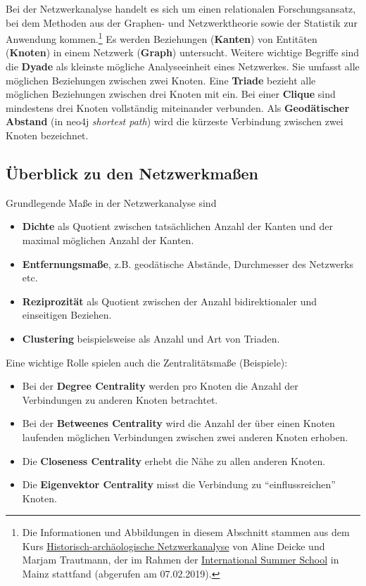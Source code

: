 \documentclass[ngerman,]{scrreprt}
\providecommand{\tightlist}{%
  \setlength{\itemsep}{0pt}\setlength{\parskip}{0pt}}
\begin{document}
Bei der Netzwerkanalyse handelt es sich um einen relationalen Forschungsansatz, bei dem Methoden aus der Graphen- und Netzwerktheorie sowie der Statistik zur Anwendung kommen.\footnote{Die Informationen und Abbildungen in diesem Abschnitt stammen aus dem Kurs \href{https://digitale-methodik.adwmainz.net/mod5/5c/slides/networkAnalysis/2018/\#/step-1}{Historisch-archäologische Netzwerkanalyse} von Aline Deicke und Marjam Trautmann, der im Rahmen der \href{https://iss.adwmainz.net}{International Summer School} in Mainz stattfand (abgerufen am 07.02.2019).} Es werden Beziehungen (\textbf{Kanten}) von Entitäten (\textbf{Knoten}) in einem Netzwerk (\textbf{Graph}) untersucht. Weitere wichtige Begriffe sind die \textbf{Dyade} als kleinste mögliche Analyseeinheit eines Netzwerkes. Sie umfasst alle möglichen Beziehungen zwischen zwei Knoten. Eine \textbf{Triade} bezieht alle möglichen Beziehungen zwischen drei Knoten mit ein. Bei einer \textbf{Clique} sind mindestens drei Knoten vollständig miteinander verbunden. Als \textbf{Geodätischer Abstand} (in neo4j \emph{shortest path}) wird die kürzeste Verbindung zwischen zwei Knoten bezeichnet.

\subsection{Überblick zu den Netzwerkmaßen}\label{uxfcberblick-zu-den-netzwerkmauxdfen}

Grundlegende Maße in der Netzwerkanalyse sind

\begin{itemize}
\tightlist
\item
  \textbf{Dichte} als Quotient zwischen tatsächlichen Anzahl der Kanten und der maximal möglichen Anzahl der Kanten.
\item
  \textbf{Entfernungsmaße}, z.B. geodätische Abstände, Durchmesser des Netzwerks etc.
\item
  \textbf{Reziprozität} als Quotient zwischen der Anzahl bidirektionaler und einseitigen Beziehen.
\item
  \textbf{Clustering} beispielsweise als Anzahl und Art von Triaden.
\end{itemize}

Eine wichtige Rolle spielen auch die Zentralitätsmaße (Beispiele):

\begin{itemize}
\tightlist
\item
  Bei der \textbf{Degree Centrality} werden pro Knoten die Anzahl der Verbindungen zu anderen Knoten betrachtet.
\item
  Bei der \textbf{Betweenes Centrality} wird die Anzahl der über einen Knoten laufenden möglichen Verbindungen zwischen zwei anderen Knoten erhoben.
\item
  Die \textbf{Closeness Centrality} erhebt die Nähe zu allen anderen Knoten.
\item
  Die \textbf{Eigenvektor Centrality} misst die Verbindung zu ``einflussreichen'' Knoten.
\end{itemize}
\end{document}
